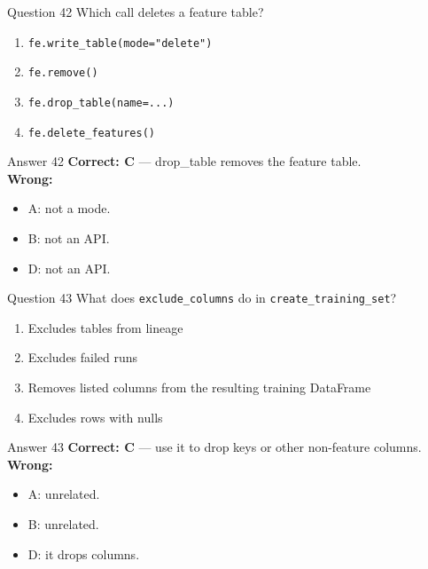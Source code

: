 \documentclass[aspectratio=169,11pt]{beamer}
\begin{document}
\begin{frame}{Question 42}
Which call deletes a feature table?
\begin{enumerate}[label=\Alph*.]
\item \texttt{fe.write\_table(mode="delete")}
\item \texttt{fe.remove()}
\item \texttt{fe.drop\_table(name=...)}
\item \texttt{fe.delete\_features()}
\end{enumerate}
\end{frame}
\begin{frame}{Answer 42}
\textbf{Correct: C} --- drop\_table removes the feature table.\\
\vspace{0.5em}
\textbf{Wrong:}
\begin{itemize}
\item A: not a mode.
\item B: not an API.
\item D: not an API.
\end{itemize}
\end{frame}

\begin{frame}{Question 43}
What does \texttt{exclude\_columns} do in \texttt{create\_training\_set}?
\begin{enumerate}[label=\Alph*.]
\item Excludes tables from lineage
\item Excludes failed runs
\item Removes listed columns from the resulting training DataFrame
\item Excludes rows with nulls
\end{enumerate}
\end{frame}
\begin{frame}{Answer 43}
\textbf{Correct: C} --- use it to drop keys or other non-feature columns.\\
\vspace{0.5em}
\textbf{Wrong:}
\begin{itemize}
\item A: unrelated.
\item B: unrelated.
\item D: it drops columns.
\end{itemize}
\end{frame}
\end{document}
